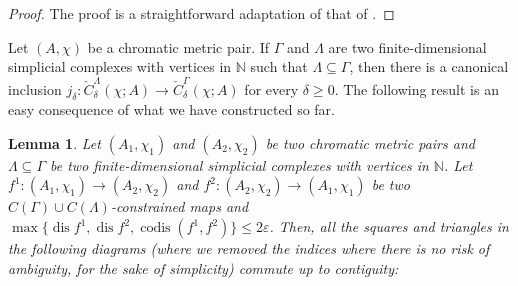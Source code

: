\documentclass[8pt,a4paper,oneside,english,english]{article}
\theoremstyle{plain}
\theoremstyle
{plain}
\newtheorem{lemma}[theorem]{Lemma}%
\theoremstyle{definition}
\newcommand{\N}{\mathbb{N}}
\newcommand{\MP}[1]{(A_{#1},\chi_{#1})}
\DeclareMathOperator{\dis}{dis}
\DeclareMathOperator{\codis}{codis}
\begin{document}
\begin{proof}
	The proof is a straightforward adaptation of that of \cite[Proposition 15]{ChoMem3}.
\end{proof}


Let $(A,\chi)$ be a chromatic metric pair. If $\Gamma$ and $\Lambda$ are two finite-dimensional simplicial complexes with vertices in $\N$ such that $\Lambda\subseteq\Gamma$, then there is a canonical inclusion $j_\delta\colon\check{C}^\Lambda_\delta(\chi;A)\to\check{C}_\delta^\Gamma(\chi;A)$ for every $\delta\geq 0$. The following result is an easy consequence of what we have constructed so far.

\begin{lemma} \label{lem:diagrams_gamma-lambda}
    Let $\MP{1}$ and $\MP{2}$ be two chromatic metric pairs and $\Lambda\subseteq \Gamma$ be two finite-dimensional simplicial complexes with vertices in $\N$. Let $f^1\colon\MP{1}\to\MP{2}$ and $f^2\colon\MP{2}\to\MP{1}$ be two $C(\Gamma)\cup C(\Lambda)$-constrained maps and $\max\{\dis f^1,\dis f^2,\codis(f^1,f^2)\}\leq 2\varepsilon$. Then, all the squares and triangles in the following diagrams (where we removed the indices where there is no risk of ambiguity, for the sake of simplicity) commute up to contiguity:

    \begin{center}


\end{center}
\end{lemma}
\end{document}
